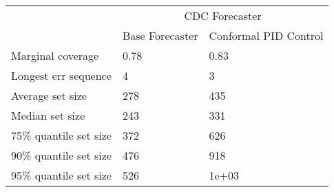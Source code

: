 \begin{tabular}{lll}
\toprule
& \multicolumn{2}{c}{CDC Forecaster} \\
& Base Forecaster & Conformal PID Control \\
\midrule
Marginal coverage & 0.78 & 0.83 \\
Longest err sequence & 4 & 3 \\
Average set size & 278 & 435 \\
Median set size & 243 & 331 \\
75\% quantile set size & 372 & 626 \\
90\% quantile set size & 476 & 918 \\
95\% quantile set size & 526 & 1e+03 \\
\bottomrule
\end{tabular}
